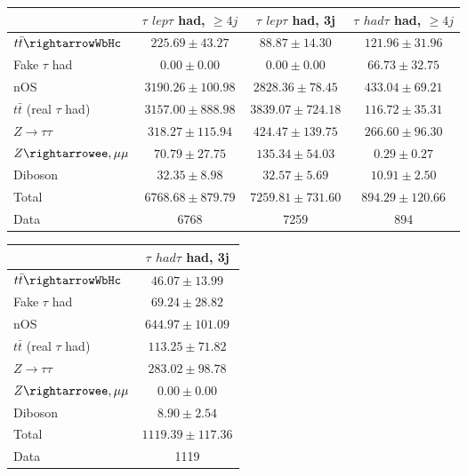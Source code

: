 \begin{table}
\begin{center}
  \begin{tabular}{ | l |  c |  c |  c | }
    \hline \hline 
     &  $\tau$ ${lep}\tau$ {had}, $\geq4j$  &  $\tau$ ${lep}\tau$ {had}, 3j  &  $\tau$ ${had}\tau$ {had}, $\geq4j$  \\ 
    \hline 
     $t\bar{t}\rightarrowWbHc$  &   $ 225.69 \pm 43.27 $ &   $ 88.87 \pm 14.30 $ &   $ 121.96 \pm 31.96 $ \\ 
     Fake $\tau$ {had}  &   $ 0.00 \pm 0.00 $ &   $ 0.00 \pm 0.00 $ &   $ 66.73 \pm 32.75 $ \\ 
    nOS  &   $ 3190.26 \pm 100.98 $ &   $ 2828.36 \pm 78.45 $ &   $ 433.04 \pm 69.21 $ \\ 
     $t\bar{t}$ (real $\tau$ {had})  &   $ 3157.00 \pm 888.98 $ &   $ 3839.07 \pm 724.18 $ &   $ 116.72 \pm 35.31 $ \\ 
     $Z\rightarrow\tau\tau$  &   $ 318.27 \pm 115.94 $ &   $ 424.47 \pm 139.75 $ &   $ 266.60 \pm 96.30 $ \\ 
     $Z\rightarrowee,\mu\mu$  &   $ 70.79 \pm 27.75 $ &   $ 135.34 \pm 54.03 $ &   $ 0.29 \pm 0.27 $ \\ 
    Diboson  &   $ 32.35 \pm 8.98 $ &   $ 32.57 \pm 5.69 $ &   $ 10.91 \pm 2.50 $ \\ 
    Total  &   $ 6768.68 \pm 879.79 $ &   $ 7259.81 \pm 731.60 $ &   $ 894.29 \pm 120.66 $ \\ 
    \hline 
    Data  & 6768  & 7259  & 894  \\ 
    \hline \hline 
  \end{tabular} 


  \begin{tabular}{ | l |  c | }
    \hline \hline 
     &  $\tau$ ${had}\tau$ {had}, 3j  \\ 
    \hline 
     $t\bar{t}\rightarrowWbHc$  &   $ 46.07 \pm 13.99 $ \\ 
     Fake $\tau$ {had}  &   $ 69.24 \pm 28.82 $ \\ 
    nOS  &   $ 644.97 \pm 101.09 $ \\ 
     $t\bar{t}$ (real $\tau$ {had})  &   $ 113.25 \pm 71.82 $ \\ 
     $Z\rightarrow\tau\tau$  &   $ 283.02 \pm 98.78 $ \\ 
     $Z\rightarrowee,\mu\mu$  &   $ 0.00 \pm 0.00 $ \\ 
    Diboson  &   $ 8.90 \pm 2.54 $ \\ 
    Total  &   $ 1119.39 \pm 117.36 $ \\ 
    \hline 
    Data  & 1119  \\ 
    \hline \hline 
  \end{tabular} 


\end{center}
\end{table}

